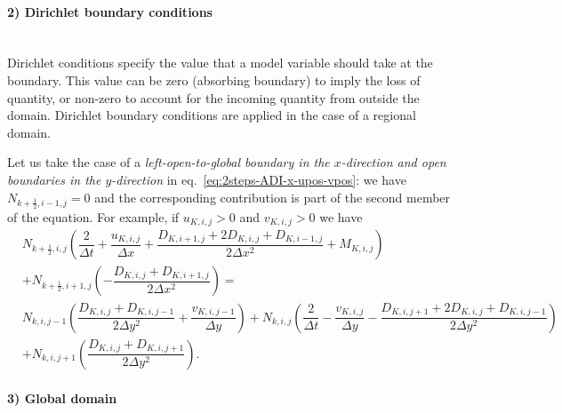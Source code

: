 \paragraph{2) Dirichlet boundary conditions} \mbox{}\\

\noindent Dirichlet conditions specify the value that a model variable should take at the boundary. This value can be zero (absorbing boundary) to imply the loss of quantity, or non-zero to account for the incoming quantity  from outside the domain. Dirichlet boundary conditions are applied in the case of a regional domain. 
 
Let us take the case of a \textit{left-open-to-global boundary in the $x$-direction and open boundaries in the $y$-direction} in eq.~\eqref{eq:2steps-ADI-x-upos-vpos}: we have 
$N_{k+\frac{1}{2},i-1,j} = 0$ 
and the corresponding contribution is part of the second member of the equation. For example, if $u_{K,i,j}>0$ and $v_{K,i,j}>0$ we have
\begin{align}
  \label{eq:2steps-ADI-x-upos-vpos+Dirichlet}
  \nonumber
  &N_{k+\frac{1}{2},i,j}  \left(
    \dfrac{2}{\Delta t} 
    +\dfrac{u_{K,i,j}}{\Delta x}
    +\dfrac{D_{K,i+1,j}+2D_{K,i,j}+D_{K,i-1,j}}{2\Delta x^2}
    + M_{K,i,j}    
    \right) \\ \nonumber
    &+ N_{k+\frac{1}{2},i+1,j} \left(
      -\dfrac{D_{K,i,j}+D_{K,i+1,j}}{2\Delta x^2}
    \right) 
    = \\
    \nonumber
    &N_{k,i,j-1}\left(\dfrac{D_{K,i,j}+D_{K,i,j-1}}{2\Delta y^2}+\dfrac{v_{K,i,j-1}}{\Delta y}\right)
    + N_{k,i,j}\left(\dfrac{2}{\Delta t}-\dfrac{v_{K,i,j}}{\Delta y}-\dfrac{D_{K,i,j+1}+2D_{K,i,j}+D_{K,i,j-1}}{2\Delta y^2} \right)\\
    &+N_{k,i,j+1}\left(\dfrac{D_{K,i,j}+D_{K,i,j+1}}{2\Delta y^2}\right).
\end{align}

\paragraph{3) Global domain} \mbox{}\\

